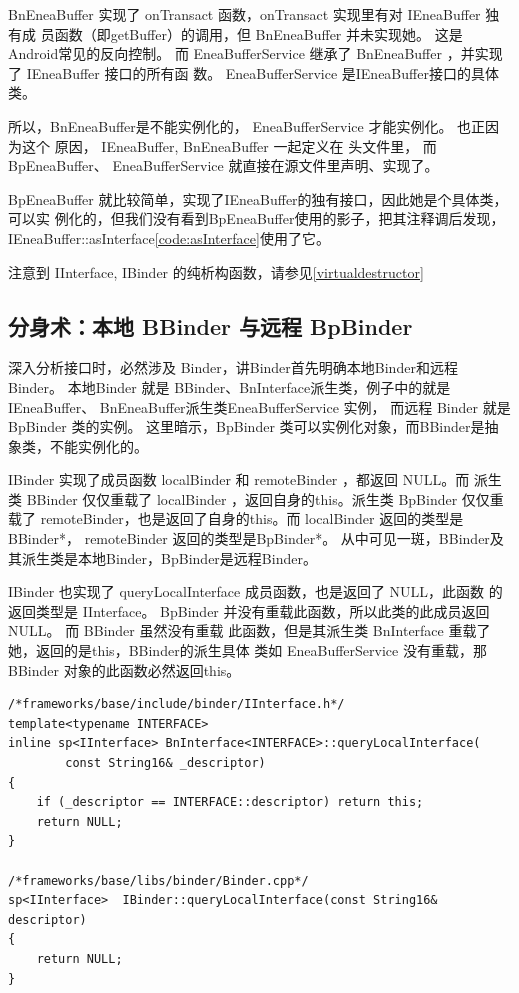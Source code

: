 \documentclass[a4paper,11pt]{article}
\begin{document}
BnEneaBuffer 实现了 onTransact 函数，onTransact 实现里有对 IEneaBuffer 独有成
员函数（即getBuffer）的调用，但 BnEneaBuffer 并未实现她。 这是Android常见的反向控制。
而 EneaBufferService 继承了 BnEneaBuffer ，并实现了 IEneaBuffer 接口的所有函
数。 EneaBufferService 是IEneaBuffer接口的具体类。

所以，BnEneaBuffer是不能实例化的， EneaBufferService 才能实例化。 也正因为这个
原因， IEneaBuffer, BnEneaBuffer 一起定义在 头文件里， 而 BpEneaBuffer、
EneaBufferService 就直接在源文件里声明、实现了。

BpEneaBuffer 就比较简单，实现了IEneaBuffer的独有接口，因此她是个具体类，可以实
例化的，但我们没有看到BpEneaBuffer使用的影子，把其注释调后发现，
IEneaBuffer::asInterface\ref{code:asInterface}使用了它。

注意到 IInterface, IBinder 的纯析构函数，请参见\ref{virtualdestructor}

\subsection{分身术：本地 BBinder 与远程 BpBinder}
深入分析接口时，必然涉及 Binder，讲Binder首先明确本地Binder和远程Binder。
本地Binder 就是 BBinder、BnInterface派生类，例子中的就是IEneaBuffer、
BnEneaBuffer派生类EneaBufferService 实例， 而远程 Binder 就是 BpBinder 类的实例。
这里暗示，BpBinder 类可以实例化对象，而BBinder是抽象类，不能实例化的。
\label{binder:LocalOrRemote}

IBinder\cite{BinderCpp} 实现了成员函数 localBinder 和 remoteBinder ，都返回 NULL。而
派生类 BBinder 仅仅重载了 localBinder ，返回自身的this。派生类 BpBinder 仅仅重载了
remoteBinder，也是返回了自身的this。而 localBinder 返回的类型是 BBinder*，  remoteBinder 返回的类型是BpBinder*。
 从中可见一斑，BBinder及其派生类是本地Binder，BpBinder是远程Binder。

IBinder 也实现了 queryLocalInterface 成员函数，也是返回了 NULL，此函数
的返回类型是 IInterface。 BpBinder 并没有重载此函数，所以此类的此成员返回NULL。 而 BBinder 虽然没有重载
此函数，但是其派生类 BnInterface 重载了她，返回的是this，BBinder的派生具体
类如 EneaBufferService 没有重载，那BBinder 对象的此函数必然返回this。
\begin{lstlisting}[caption=queryLocalInterface 的实现]
/*frameworks/base/include/binder/IInterface.h*/
template<typename INTERFACE>
inline sp<IInterface> BnInterface<INTERFACE>::queryLocalInterface(
        const String16& _descriptor)
{
    if (_descriptor == INTERFACE::descriptor) return this;
    return NULL;
}    

/*frameworks/base/libs/binder/Binder.cpp*/
sp<IInterface>  IBinder::queryLocalInterface(const String16& descriptor)
{
    return NULL;
} 
\end{lstlisting}
\end{document}
